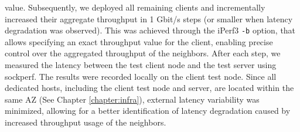 value. Subsequently, we deployed all remaining clients and incrementally increased their aggregate 
throughput in 1 Gbit/s steps (or smaller when latency degradation was observed).
This was achieved through the iPerf3 \texttt{-b} option, that allows specifying an exact throughput 
value for the client, enabling precise control over the aggregated throughput of the neighbors.
After each step, we measured the latency between the test client node and 
the test server using sockperf. The results were recorded locally on the client test node. 
Since all dedicated hosts, including the client test node and server, are located within 
the same \ac{AZ} (See Chapter \ref{chapter:infra}),
external latency variability was minimized, allowing for a better identification of latency 
degradation caused by increased throughput usage of the neighbors. \\ 